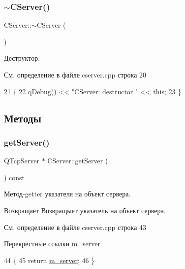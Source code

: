 \subsubsection{\texorpdfstring{$\sim$\+C\+Server()}{~CServer()}}
{\footnotesize\ttfamily C\+Server\+::$\sim$\+C\+Server (\begin{DoxyParamCaption}{ }\end{DoxyParamCaption})}



Деструктор. 



См. определение в файле cserver.\+cpp строка 20


\begin{DoxyCode}
21 \{
22     qDebug() << \textcolor{stringliteral}{"CServer: destructor "} << \textcolor{keyword}{this};
23 \}
\end{DoxyCode}


\subsection{Методы}
\hypertarget{class_c_server_a3ad6eca8c26fc7852aaf1c626c84e220}{}\label{class_c_server_a3ad6eca8c26fc7852aaf1c626c84e220} 
\subsubsection{\texorpdfstring{get\+Server()}{getServer()}}
{\footnotesize\ttfamily Q\+Tcp\+Server $\ast$ C\+Server\+::get\+Server (\begin{DoxyParamCaption}{ }\end{DoxyParamCaption}) const}



Метод-\/getter указателя на объект сервера. 

\begin{DoxyReturn}{Возвращает}
Возвращыет указатель на объект сервера. 
\end{DoxyReturn}


См. определение в файле cserver.\+cpp строка 43



Перекрестные ссылки m\+\_\+server.


\begin{DoxyCode}
44 \{
45     \textcolor{keywordflow}{return} \hyperlink{class_c_server_a0ee5b734ddfc86fc181e767700f7a46b}{m\_server};
46 \}
\end{DoxyCode}
\hypertarget{class_c_server_a32c8f33336a76b36c2653553b970e76c}{}\label{class_c_server_a32c8f33336a76b36c2653553b970e76c} 
